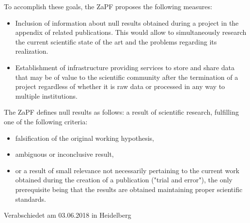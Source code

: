 \documentclass[DIV=calc]{scrartcl}
\begin{document}
To accomplish these goals, the ZaPF proposes the following measures:
\begin{itemize}
\item Inclusion of information about null results obtained during a project in the appendix of related publications. This would allow to simultaneously research the current scientific state of the art and the problems regarding its realization.

\item Establishment of infrastructure providing services to store and share data that may be of value to the scientific community after the termination of a project regardless of whether it is raw data or processed in any way to multiple institutions.
\end{itemize}
\newpage
[1] The ZaPF defines null results as follows: a result of scientific research, fulfilling one of the following criteria:
\begin{itemize}
\item falsification of the original working hypothesis,
\item ambiguous or inconclusive result,
\item or a result of small relevance not necessarily pertaining to the current work obtained during the creation of a publication ("trial and error"), 
the only prerequisite being that the results are obtained maintaining proper scientific standards.
\end{itemize}
\vfill
    \begin{flushright}
        Verabschiedet am 03.06.2018 in Heidelberg
    \end{flushright}
\end{document}
